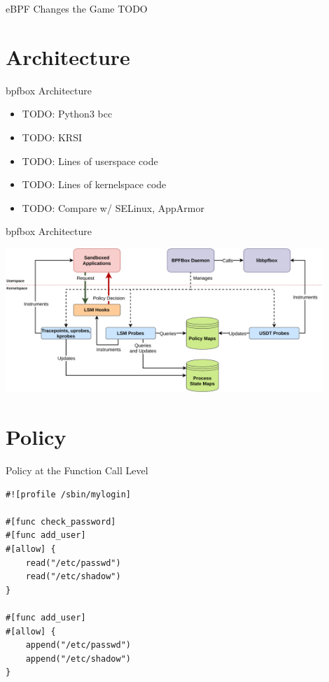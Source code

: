 \documentclass[12pt, dvipsnames]{beamer}
\begin{document}

\begin{frame}[t]{eBPF Changes the Game}
TODO
\end{frame}

\section{Architecture}

\begin{frame}[t]{bpfbox Architecture}
\begin{itemize}
    \item TODO: Python3 bcc
    \item TODO: KRSI
    \item TODO: Lines of userspace code
    \item TODO: Lines of kernelspace code
    \item TODO: Compare w/ SELinux, AppArmor
\end{itemize}
\end{frame}

\begin{frame}[t]{bpfbox Architecture}
\vfill
\begin{center}
    \color{black}
    \includegraphics[width=0.9\textwidth]{figs/bpfbox-overview.pdf}
\end{center}
\vfill
\end{frame}

\section{Policy}

\begin{frame}[t, fragile]{Policy at the Function Call Level}
\begin{lstlisting}[language=bpfbox]
#![profile /sbin/mylogin]

#[func check_password]
#[func add_user]
#[allow] {
    read("/etc/passwd")
    read("/etc/shadow")
}

#[func add_user]
#[allow] {
    append("/etc/passwd")
    append("/etc/shadow")
}
\end{lstlisting}
\end{frame}
\end{document}
